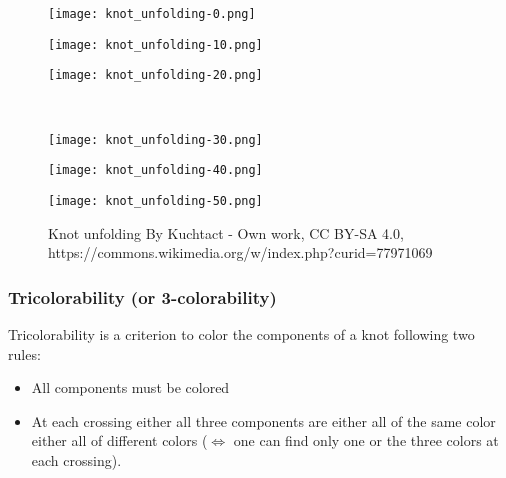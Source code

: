 \documentclass[12pt, a4paper]{article}
\begin{document}
\begin{figure}[H]
  \begin{minipage}[c]{.2\textwidth}
  \centering
  \texttt{[image: knot\_unfolding-0.png]}
    
  \end{minipage}
  \hfill
  \begin{minipage}[c]{.2\textwidth}
  \centering
  \texttt{[image: knot\_unfolding-10.png]}
    
  \end{minipage}
  \hfill
  \begin{minipage}[c]{.2\textwidth}
  \centering
  \texttt{[image: knot\_unfolding-20.png]}
    
  \end{minipage}\\
  \begin{minipage}[c]{.2\textwidth}
  \centering
  \texttt{[image: knot\_unfolding-30.png]}
    
  \end{minipage}
  \hfill
  \begin{minipage}[c]{.2\textwidth}
  \centering
  \texttt{[image: knot\_unfolding-40.png]}
    
  \end{minipage}
  \hfill
  \begin{minipage}[c]{.2\textwidth}
  \centering
  \texttt{[image: knot\_unfolding-50.png]}
    
  \end{minipage}
  \caption{Knot unfolding By Kuchtact - Own work, CC BY-SA 4.0, https://commons.wikimedia.org/w/index.php?curid=77971069}
  \label{fig:unknot}
  
\end{figure}

\subsubsection{Tricolorability (or 3-colorability)}

Tricolorability is a criterion to color the components of a knot following two rules:

\begin{itemize}
  \item All components must be colored
  \item At each crossing either all three components are either all of the same color either all of different colors ($\Longleftrightarrow$ one can find only one or the three colors at each crossing). 
\end{itemize}
\end{document}
